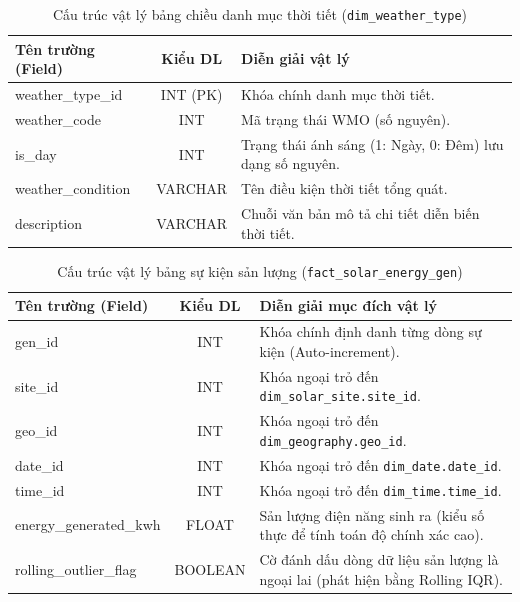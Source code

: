 \documentclass[12pt,a4paper]{article}
\begin{document}
\begin{table}[H]
\centering
\caption{Cấu trúc vật lý bảng chiều danh mục thời tiết (\texttt{dim\_weather\_type})}
\label{tab:dim_weather_type}
\renewcommand{\arraystretch}{1.4}
\begin{tabularx}{\textwidth}{p{4.5cm} c X}
\toprule
\textbf{Tên trường (Field)} & \textbf{Kiểu DL} & \textbf{Diễn giải vật lý} \\
\midrule
weather\_type\_id    & INT (PK) & Khóa chính danh mục thời tiết. \\
weather\_code       & INT      & Mã trạng thái WMO (số nguyên). \\
is\_day             & INT      & Trạng thái ánh sáng (1: Ngày, 0: Đêm) lưu dạng số nguyên. \\
weather\_condition  & VARCHAR  & Tên điều kiện thời tiết tổng quát. \\
description         & VARCHAR  & Chuỗi văn bản mô tả chi tiết diễn biến thời tiết. \\
\bottomrule
\end{tabularx}
\end{table}

\begin{table}[H]
\centering
\caption{Cấu trúc vật lý bảng sự kiện sản lượng (\texttt{fact\_solar\_energy\_gen})}
\label{tab:fact_gen_spec}
\renewcommand{\arraystretch}{1.4}
\begin{tabularx}{\textwidth}{p{4.5cm} c X}
\toprule
\textbf{Tên trường (Field)} & \textbf{Kiểu DL} & \textbf{Diễn giải mục đích vật lý} \\
\midrule
gen\_id & INT & Khóa chính định danh từng dòng sự kiện (Auto-increment). \\
site\_id & INT & Khóa ngoại trỏ đến \texttt{dim\_solar\_site.site\_id}. \\
geo\_id & INT & Khóa ngoại trỏ đến \texttt{dim\_geography.geo\_id}. \\
date\_id & INT & Khóa ngoại trỏ đến \texttt{dim\_date.date\_id}. \\
time\_id & INT & Khóa ngoại trỏ đến \texttt{dim\_time.time\_id}. \\
energy\_generated\_kwh & FLOAT & Sản lượng điện năng sinh ra (kiểu số thực để tính toán độ chính xác cao). \\
rolling\_outlier\_flag & BOOLEAN & Cờ đánh dấu dòng dữ liệu sản lượng là ngoại lai (phát hiện bằng Rolling IQR). \\
\bottomrule
\end{tabularx}
\end{table}
\end{document}
